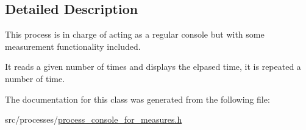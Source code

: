\subsection{Detailed Description}
This process is in charge of acting as a regular console but with some measurement functionality included. 

It reads a given number of times and displays the elpased time, it is repeated a number of time. 

The documentation for this class was generated from the following file\+:\begin{DoxyCompactItemize}
\item 
src/processes/\hyperlink{process__console__for__measures_8h}{process\+\_\+console\+\_\+for\+\_\+measures.\+h}\end{DoxyCompactItemize}
